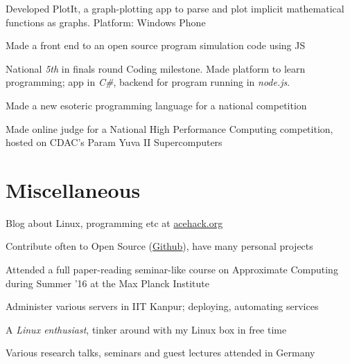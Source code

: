 \documentclass[a4paper]{deedy-resume} %
\newcommand{\onepage}[1]{
  \ifdefined\onep
  #1
  \fi
}
\begin{document}
\begin{minipage}[t]{0.66\textwidth}
  \runsubsection{}
  \begin{tightitemize}
  \item Developed PlotIt, a graph-plotting app to parse and plot
    implicit mathematical functions as graphs. Platform: Windows
    Phone
  \item Made a front end to an open source program simulation code
    using JS
  \item National \textit{5th} in finals round Coding milestone.
    Made platform to learn programming; app in
    \textit{C\#}, backend for program running in \textit{node.js}.
  \end{tightitemize}

  \sectionspace

  \runsubsection{}
  \begin{tightitemize}
    \item Made a new esoteric programming language for a national
      competition
    \item Made online judge for a National High Performance Computing competition, hosted on CDAC’s Param Yuva II Supercomputers
  \end{tightitemize}

  \section{Miscellaneous}
  \vspace{\topsep}
  \begin{tightitemize}
  \item Blog about Linux, programming etc at
    \href{http://acehack.org}{acehack.org}
  \item Contribute often to Open Source
    (\href{https://github.com/sakshamsharma}{Github}), have many
    personal projects
  \item	Attended a full paper-reading seminar-like course on
    Approximate Computing during Summer ’16 at the Max Planck
    Institute
  \item Administer \onepage{various} servers in IIT Kanpur; deploying,
    automating services
  \item A \textit{Linux enthusiast}, tinker around with my Linux box
    in free time
  \item Various research talks, seminars and guest lectures attended
    in Germany
  \end{tightitemize}

\end{minipage}
\end{document}
